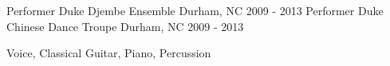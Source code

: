 \begin{cventries} 
    \cventry
        {Performer}
        {Duke Djembe Ensemble}
        {Durham, NC}
        {2009 - 2013}
    \cventry
        {Performer}
        {Duke Chinese Dance Troupe}
        {Durham, NC}
        {2009 - 2013}
    \begin{cvskills}
                {Voice, Classical Guitar, Piano, Percussion}
    \end{cvskills}
\end{cventries}
